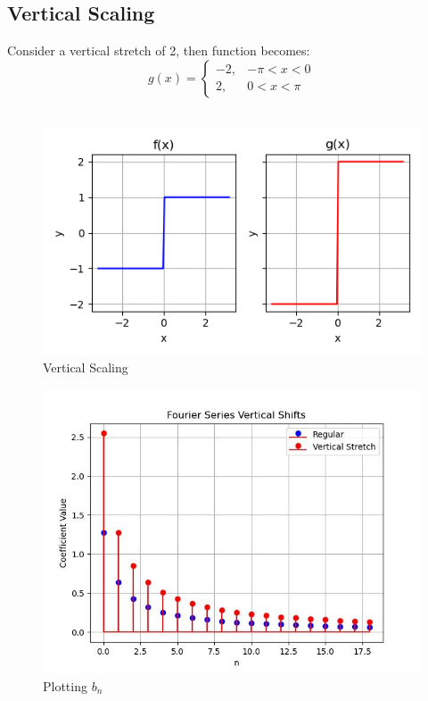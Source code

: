 \documentclass{article}
\begin{document}
\subsection{Vertical Scaling}
Consider a vertical stretch of 2, then function becomes: 
\begin{equation}
g(x) = 
\begin{cases} 
-2, & -\pi < x < 0 \\
2, & 0 < x < \pi
\end{cases}
\end{equation}\\
\begin{figure}
    \centering
    \includegraphics[width=\textwidth]{vertical_scaling.png}
    \caption{Vertical Scaling}
    \label{fig:enter-label}
\end{figure}
\begin{figure}
    \centering
    \includegraphics[width=\textwidth]{vertical_stem_stretch.jpg}
    \caption{Plotting $b_n$}
    \label{fig:enter-label}
\end{figure}
\end{document}
